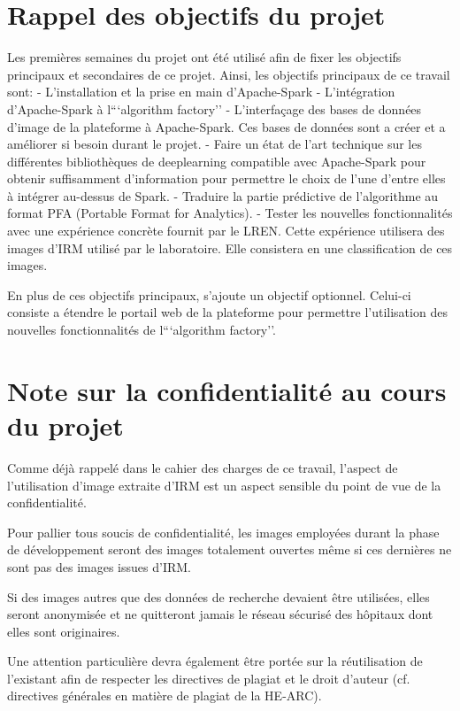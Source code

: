\documentclass[a4paper,10pt,openany,oneside]{sphinxmanual}
\begin{document}
\section{Rappel des objectifs du projet}
\label{index:rappel-des-objectifs-du-projet}
Les premières semaines du projet ont été utilisé afin de fixer les objectifs principaux et secondaires de ce projet. Ainsi, les objectifs
principaux de ce travail sont:
- L'installation et la prise en main d'Apache-Spark
- L'intégration d'Apache-Spark à l```algorithm factory''
- L'interfaçage des bases de données d'image de la plateforme à Apache-Spark. Ces bases de données sont a créer et a améliorer si besoin
durant le projet.
- Faire un état de l'art technique sur les différentes bibliothèques de deeplearning compatible avec Apache-Spark pour obtenir suffisamment
d'information pour permettre le choix de l'une d'entre elles à intégrer au-dessus de Spark.
- Traduire la partie prédictive de l'algorithme au format PFA (Portable Format for Analytics).
- Tester les nouvelles fonctionnalités avec une expérience concrète fournit par le LREN. Cette expérience utilisera des images d'IRM utilisé
par le laboratoire. Elle consistera en une classification de ces images.

En plus de ces objectifs principaux, s'ajoute un objectif optionnel. Celui-ci consiste a étendre le portail web de la plateforme pour
permettre l'utilisation des nouvelles fonctionnalités de l```algorithm factory''.


\section{Note sur la confidentialité au cours du projet}
\label{index:note-sur-la-confidentialite-au-cours-du-projet}
Comme déjà rappelé dans le cahier des charges de ce travail, l’aspect de l’utilisation d’image extraite d’IRM est un aspect sensible du point
de vue de la confidentialité.

Pour pallier tous soucis de confidentialité, les images employées durant la phase de développement seront des images totalement ouvertes même
si ces dernières ne sont pas des images issues d’IRM.

Si des images autres que des données de recherche devaient être utilisées, elles seront anonymisée et ne quitteront jamais le réseau sécurisé des
hôpitaux dont elles sont originaires.

Une attention particulière devra également être portée sur la réutilisation de l’existant afin de respecter les directives de plagiat et le droit
d’auteur (cf. directives générales en matière de plagiat de la HE-ARC).
\end{document}
